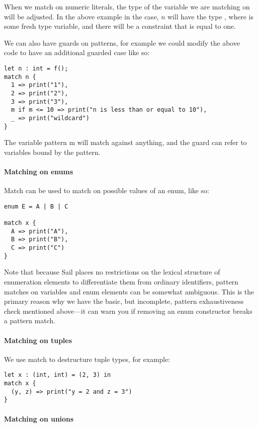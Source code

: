 When we match on numeric literals, the type of the variable we are
matching on will be adjusted. In the above example in the
 case, $n$ will have the type , where
 is some fresh type variable, and there will be a constraint
that  is equal to one.

We can also have guards on patterns, for example we could modify the
above code to have an additional guarded case like so:
\begin{lstlisting}
let n : int = f();
match n {
  1 => print("1"),
  2 => print("2"),
  3 => print("3"),
  m if m <= 10 => print("n is less than or equal to 10"),
  _ => print("wildcard")
}
\end{lstlisting}
The variable pattern m will match against anything, and the guard can
refer to variables bound by the pattern.

\paragraph{Matching on enums}

Match can be used to match on possible values of an enum, like so:
\begin{lstlisting}
enum E = A | B | C

match x {
  A => print("A"),
  B => print("B"),
  C => print("C")
}
\end{lstlisting}
Note that because Sail places no restrictions on the lexical structure
of enumeration elements to differentiate them from ordinary
identifiers, pattern matches on variables and enum elements can be
somewhat ambiguous. This is the primary reason why we have the basic,
but incomplete, pattern exhaustiveness check mentioned above---it can
warn you if removing an enum constructor breaks a pattern match.

\paragraph{Matching on tuples}

We use match to destructure tuple types, for example:
\begin{lstlisting}
let x : (int, int) = (2, 3) in
match x {
  (y, z) => print("y = 2 and z = 3")
}

\end{lstlisting}

\paragraph{Matching on unions}

